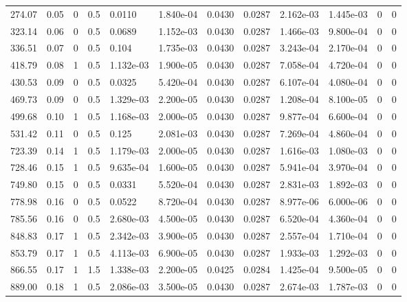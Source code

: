 \documentclass[preview]{standalone}
\begin{document}
{{\begin{tabular}{L{1.2cm}C{1.2cm} C{0.3cm}C{0.5cm} C{1.4cm}C{1.4cm} C{1.4cm}C{1.4cm} C{1.6cm}C{1.6cm} C{1.6cm}C{1.6cm}}
  274.07  &  0.05  & 0     & 0.5 &  0.0110  & 1.840e-04  &  0.0430&   0.0287& 2.162e-03 & 1.445e-03   &  0 & 0  \\ 
  323.14  &  0.06  & 0     & 0.5 &  0.0689  & 1.152e-03  &  0.0430&   0.0287& 1.466e-03 & 9.800e-04   &  0 & 0  \\ 
  336.51  &  0.07  & 0     & 0.5 &  0.104  & 1.735e-03  &  0.0430&   0.0287& 3.243e-04 & 2.170e-04   &  0 & 0  \\ 
  418.79  &  0.08  & 1     & 0.5 &  1.132e-03  & 1.900e-05  &  0.0430&   0.0287& 7.058e-04 & 4.720e-04   &  0 & 0  \\ 
  430.53  &  0.09  & 0     & 0.5 &  0.0325  & 5.420e-04  &  0.0430&   0.0287& 6.107e-04 & 4.080e-04   &  0 & 0  \\ 
  469.73  &  0.09  & 0     & 0.5 &  1.329e-03  & 2.200e-05  &  0.0430&   0.0287& 1.208e-04 & 8.100e-05   &  0 & 0  \\ 
  499.68  &  0.10  & 1     & 0.5 &  1.168e-03  & 2.000e-05  &  0.0430&   0.0287& 9.877e-04 & 6.600e-04   &  0 & 0  \\ 
  531.42  &  0.11  & 0     & 0.5 &  0.125  & 2.081e-03  &  0.0430&   0.0287& 7.269e-04 & 4.860e-04   &  0 & 0  \\ 
  723.39  &  0.14  & 1     & 0.5 &  1.179e-03  & 2.000e-05  &  0.0430&   0.0287& 1.616e-03 & 1.080e-03   &  0 & 0  \\ 
  728.46  &  0.15  & 1     & 0.5 &  9.635e-04  & 1.600e-05  &  0.0430&   0.0287& 5.941e-04 & 3.970e-04   &  0 & 0  \\ 
  749.80  &  0.15  & 0     & 0.5 &  0.0331  & 5.520e-04  &  0.0430&   0.0287& 2.831e-03 & 1.892e-03   &  0 & 0  \\ 
  778.98  &  0.16  & 0     & 0.5 &  0.0522  & 8.720e-04  &  0.0430&   0.0287& 8.977e-06 & 6.000e-06   &  0 & 0  \\ 
  785.56  &  0.16  & 0     & 0.5 &  2.680e-03  & 4.500e-05  &  0.0430&   0.0287& 6.520e-04 & 4.360e-04   &  0 & 0  \\ 
  848.83  &  0.17  & 1     & 0.5 &  2.342e-03  & 3.900e-05  &  0.0430&   0.0287& 2.557e-04 & 1.710e-04   &  0 & 0  \\ 
  853.79  &  0.17  & 1     & 0.5 &  4.113e-03  & 6.900e-05  &  0.0430&   0.0287& 1.933e-03 & 1.292e-03   &  0 & 0  \\ 
  866.55  &  0.17  & 1     & 1.5 &  1.338e-03  & 2.200e-05  &  0.0425&   0.0284& 1.425e-04 & 9.500e-05   &  0 & 0  \\ 
  889.00  &  0.18  & 1     & 0.5 &  2.086e-03  & 3.500e-05  &  0.0430&   0.0287& 2.674e-03 & 1.787e-03   &  0 & 0  \\ 

\end{tabular}}}
\end{document}
